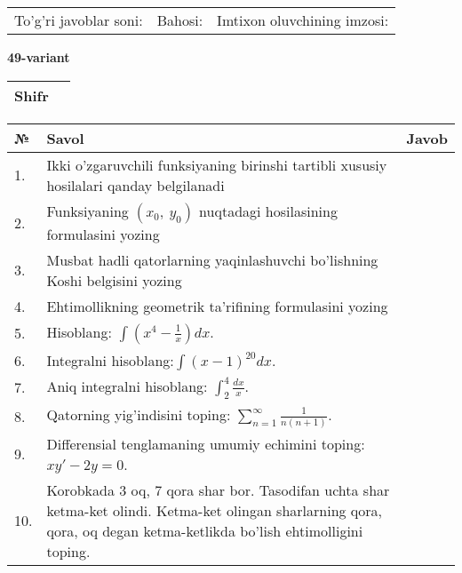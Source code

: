 \documentclass{article}
\begin{document}
  \vspace{1cm}
  
  \begin{tabular}{lll}
  To'g'ri javoblar soni: \underline{\hspace{1.5cm}} & 
  Bahosi: \underline{\hspace{1.5cm}} & 
  Imtixon oluvchining imzosi: \underline{\hspace{2cm}} \\
  \end{tabular}
  
  \egroup
  
  \newpage
  
  
  \textbf{49-variant}\\
  
  \bgroup
  \def\arraystretch{1.6} %
  
  \begin{tabular}{|m{5.7cm}|m{9.5cm}|}
  \hline
  Shifr & \\
  \hline
  \end{tabular}
  
  \vspace{1cm}
  
  \begin{tabular}{|m{0.7cm}|m{10cm}|m{4cm}|}
  \hline
  № & Savol & Javob \\
  \hline
  1. & Ikki o'zgaruvchili funksiyaning birinshi tartibli xususiy hosilalari qanday belgilanadi &  \\
  \hline
  2. & Funksiyaning \((x_{0},\ y_{0})\) nuqtadagi hosilasining formulasini yozing &  \\
  \hline
  3. & Musbat hadli qatorlarning yaqinlashuvchi bo'lishning Koshi belgisini yozing &  \\
  \hline
  4. & Ehtimollikning geometrik ta'rifining formulasini yozing &  \\
  \hline
  5. & Hisoblang: \(\int \left( x^{4} - \frac{1}{x} \right)dx\). &  \\
  \hline
  6. & Integralni hisoblang:\(\int {(x - 1)^{20}}dx\). &  \\
  \hline
  7. & Aniq integralni hisoblang: \(\int_{2}^{4}\frac{dx}{x}\). &  \\
  \hline
  8. & Qatorning yig'indisini toping: \(\sum_{n = 1}^{\infty}\frac{1}{n(n + 1)}\). &  \\
  \hline
  9. & Differensial tenglamaning umumiy echimini toping: \(xy' - 2y = 0\). &  \\
  \hline
  10. & Korobkada 3 oq, 7 qora shar bor. Tasodifan uchta shar ketma-ket olindi. Ketma-ket olingan sharlarning qora, qora, oq degan ketma-ketlikda bo'lish ehtimolligini toping. &  \\
  \hline
  \end{tabular}
  
\end{document}
